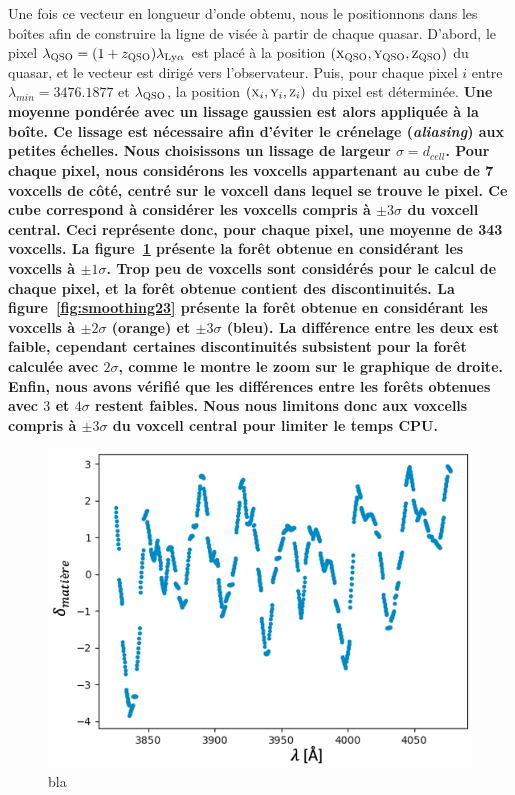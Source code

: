 \documentclass[11pt, twoside, a4paper, openright]{report}
\begin{document}
Une fois ce vecteur en longueur d'onde obtenu, nous le positionnons dans les boîtes afin de construire la ligne de visée à partir de chaque quasar.
D'abord, le pixel $\lambda_{\textsc{QSO}} = (1+z_{\textsc{QSO}}) \lambda_{\mathrm{Ly}\alpha}$ est placé à la position $(\textsc{x}_{\textsc{QSO}}, \textsc{y}_{\textsc{QSO}}, \textsc{z}_{\textsc{QSO}})$ du quasar, et le vecteur est dirigé vers l'observateur. Puis, pour chaque pixel $i$ entre $\lambda_{min} = \num{3476.1877}$ et $\lambda_{\textsc{QSO}}$, la position $(\textsc{x}_i, \textsc{y}_i, \textsc{z}_i)$ du pixel est déterminée.
\textbf{Une moyenne pondérée avec un lissage gaussien est alors appliquée à la boîte.
Ce lissage est nécessaire afin d'éviter le crénelage (\emph{aliasing}) aux petites échelles.
  Nous choisissons un lissage de largeur $\sigma = d_{cell}$.
Pour chaque pixel, nous considérons les voxcells appartenant au cube de 7 voxcells de côté, centré sur le voxcell dans lequel se trouve le pixel. Ce cube correspond à considérer les voxcells compris à $\pm 3 \sigma$ du voxcell central. %
Ceci représente donc, pour chaque pixel, une moyenne de \num{343} voxcells.
La figure~\ref{fig:smoothing11} présente la forêt \lya{} obtenue en considérant les voxcells à $\pm 1 \sigma$. Trop peu de voxcells sont considérés pour le calcul de chaque pixel, et la forêt obtenue contient des discontinuités. La figure~\ref{fig:smoothing23} présente la forêt obtenue en considérant les voxcells à $\pm 2 \sigma$ (orange) et $\pm 3 \sigma$ (bleu). La différence entre les deux est faible, cependant certaines discontinuités subsistent pour la forêt calculée avec $2 \sigma$, comme le montre le zoom sur le graphique de droite. Enfin, nous avons vérifié que les différences entre les forêts obtenues avec $3$ et $4 \sigma$ restent faibles. Nous nous limitons donc aux voxcells compris à $\pm 3 \sigma$ du voxcell central pour limiter le temps CPU.}
\begin{figure}
  \centering
  \includegraphics[scale=0.5]{smoothing11}
  \caption{bla}
  \label{fig:smoothing11}
\end{figure}
\end{document}
